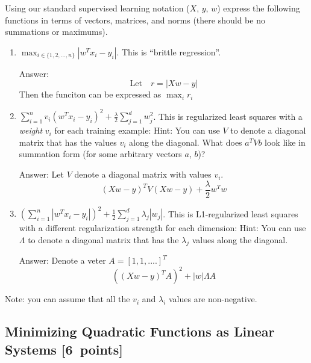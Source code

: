 \documentclass{article}
\newcommand{\blu}[1]{{\textcolor{blu}{#1}}}
\newenvironment{answer}{\par\begingroup\color{gre}Answer: }{\endgroup}
\let\ask\blu
\newcommand\pts[1]{\textcolor{pointscolour}{[#1~points]}}
\begin{document}
Using our standard supervised learning notation ($X$, $y$, $w$)
\ask{express the following functions in terms of vectors, matrices, and norms} (there should be no summations or maximums).
\begin{enumerate}
\item $\max_{i \in \{1,2,\dots,n\}}  |w^Tx_i - y_i|$. This is ``brittle regression''.
\begin{answer}
	\begin{equation}
		\text{Let} \quad r = | X w - y |
	\end{equation}
	Then the funciton can be expressed as $\max_i r_i$
\end{answer}
\item $\sum_{i=1}^n v_i(w^Tx_i  - y_i)^2 + \frac{\lambda}{2}\sum_{j=1}^d w_j^2$. This is regularized least squares with a \emph{weight} $v_i$ for each training example:  Hint: You can use $V$ to denote a diagonal matrix that has the values $v_i$ along the diagonal. What does $a^T V b$ look like in summation form (for some arbitrary vectors $a$, $b$)?
\begin{answer}
	Let $V$ denote a diagonal matrix with values $v_{i}$.
	\begin{equation}
		(X w - y)^{T} V (X w - y) + \frac{\lambda}{2} w^{T} w
	\end{equation}
\end{answer}

\item $\left(\sum_{i=1}^n |w^Tx_i - y_i|\right)^2 +  \frac12 \sum_{j=1}^{d} \lambda_j|w_j|$. This is L1-regularized least squares with a different regularization strength for each dimension: Hint: You can use  $\Lambda$ to denote a diagonal matrix that has the $\lambda_j$ values along the diagonal.
\begin{answer}
	Denote a veter $A = [1,1,....]^{T}$
	\begin{equation}
		((X w - y)^{T} A)^2 + |w| \Lambda A
	\end{equation}
	
\end{answer}
\end{enumerate}

Note: you can assume that all the $v_i$ and $\lambda_i$ values are non-negative.

\subsection{Minimizing Quadratic Functions as Linear Systems \pts{6}} \label{sec:lin-sys}
\end{document}
